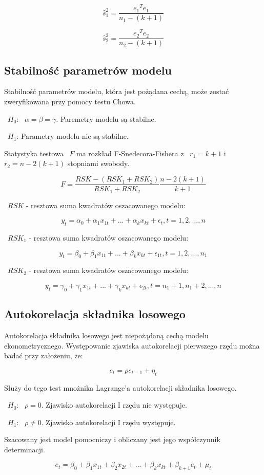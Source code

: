 \documentclass{article}
\begin{document}
\[\hat{s}_1^2 = \frac{{e_1}^T{e_1}}{n_1-(k+1)}\]

\[\hat{s}_2^2 = \frac{{e_2}^T{e_2}}{n_2-(k+1)}\]

\newpage
\subsection{Stabilność parametrów modelu}
Stabilność parametrów modelu, która jest pożądana cechą, może zostać zweryfikowana przy pomocy testu Chowa.

~$H_0$: ~$\alpha = \beta = \gamma$. Paremetry modelu są stabilne.

~$H_1$: Parametry modelu nie są stabilne.

Statystyka testowa ~$F$ ma rozkład F-Snedecora-Fishera z ~$r_1 = k+1$ i ~$r_2 = n - 2(k + 1)$ stopniami swobody.

\[F = \frac{RSK - (RSK_1 + RSK_2)}{RSK_1 + RSK_2}\frac{n - 2(k+1)}{k + 1}\]

~$RSK$ - resztowa suma kwadratów oszacowanego modelu:

\[y_t = \alpha_0 + \alpha_1x_{1t}+...+\alpha_kx_{kt}+\epsilon_t,t=1,2,...,n\]

~$RSK_1$ - resztowa suma kwadratów oszacowanego modelu:

\[y_t = \beta_0 + \beta_1x_{1t}+...+\beta_kx_{kt}+\epsilon_{1t},t=1,2,...,n_1\]

~$RSK_2$ - resztowa suma kwadratów oszacowanego modelu:

\[y_t = \gamma_0 + \gamma_1x_{1t}+...+\gamma_kx_{kt}+\epsilon_{2t},t=n_1+1,n_1+2,...,n\]

\subsection{Autokorelacja składnika losowego}
Autokorelacja składnika losowego jest niepożądaną cechą modelu ekonometrycznego. Występowanie zjawiska autokorelacji pierwszego rzędu można badać przy założeniu, że:

\[e_t = \rho e_{t-1}+\eta_t\]

Służy do tego test mnożnika Lagrange'a autokorelacji składnika losowego.

~$H_0$: ~$\rho=0$. Zjawisko autokorelacji I rzędu nie występuje.

~$H_1$: ~$\rho\neq0$. Zjawisko autokorelacji I rzędu występuje.

Szacowany jest model pomocniczy i obliczany jest jego współczynnik determinacji.

\[e_t=\beta_0+\beta_1x_{1t}+\beta_2x_{2t}+...+\beta_kx_{kt}+\beta_{k+1}e_t+\mu_t\]
\end{document}
